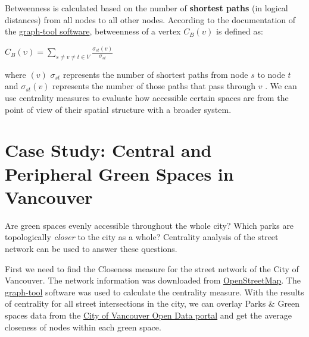 \documentclass[
]{book}
\begin{document}
Betweenness is calculated based on the number of \textbf{shortest paths} (in logical distances) from all nodes to all other nodes. According to the documentation of the \href{https://graph-tool.skewed.de/static/doc/centrality.html}{graph-tool software}, betweenness of a vertex \(C_{B}(\upsilon)\) is defined as:

\(C_{B}(\upsilon) = \sum\limits_{s \neq v \neq t \in V} \frac {\sigma_{st}(v)}{\sigma_{st}}\)

where \((v)\) \({\sigma_{st}}\) represents the number of shortest paths from node \(s\) to node \(t\) and \({\sigma_{st}(v)}\) represents the number of those paths that pass through \(v\) \citep{graph-tool_centrality_nodate}. We can use centrality measures to evaluate how accessible certain spaces are from the point of view of their spatial structure with a broader system.

\section{Case Study: Central and Peripheral Green Spaces in Vancouver}\label{case-study-central-and-peripheral-green-spaces-in-vancouver}

Are green spaces evenly accessible throughout the whole city? Which parks are topologically \emph{closer} to the city as a whole? Centrality analysis of the street network can be used to answer these questions.

First we need to find the Closeness measure for the street network of the City of Vancouver. The network information was downloaded from \href{https://www.openstreetmap.org/}{OpenStreetMap}. The \href{https://graph-tool.skewed.de/}{graph-tool} software was used to calculate the centrality measure. With the results of centrality for all street intersections in the city, we can overlay Parks \& Green spaces data from the \href{https://opendata.vancouver.ca/explore/dataset/parks-polygon-representation/information/}{City of Vancouver Open Data portal} and get the average closeness of nodes within each green space.
\end{document}
